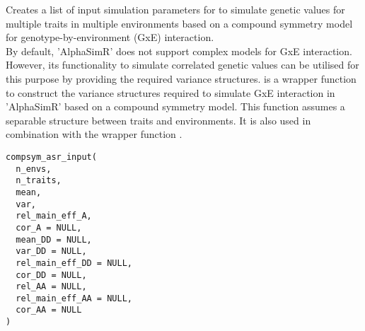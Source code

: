 \documentclass[a4paper]{book}
\begin{document}
%
\begin{Description}\relax
Creates a list of input simulation parameters for
 to simulate
genetic values for multiple traits in multiple environments based on a compound symmetry model
for genotype-by-environment (GxE) interaction. \\{}
By default, 'AlphaSimR' does not support complex models for GxE interaction. However, its
functionality to simulate correlated genetic values can be utilised for this purpose by
providing the required variance structures.  is a wrapper function to
construct the variance structures required to simulate GxE interaction in 'AlphaSimR' based on
a compound symmetry model. This function assumes a separable structure between traits and
environments. It is also used in combination with the wrapper function
.
\end{Description}
%
\begin{Usage}
\begin{verbatim}
compsym_asr_input(
  n_envs,
  n_traits,
  mean,
  var,
  rel_main_eff_A,
  cor_A = NULL,
  mean_DD = NULL,
  var_DD = NULL,
  rel_main_eff_DD = NULL,
  cor_DD = NULL,
  rel_AA = NULL,
  rel_main_eff_AA = NULL,
  cor_AA = NULL
)
\end{verbatim}
\end{Usage}
%
\end{document}
